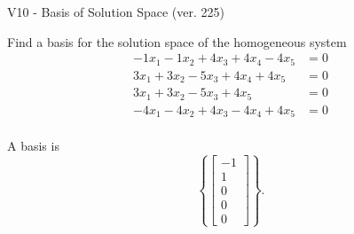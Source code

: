\begin{exercise}
  \begin{exerciseTitle}V10 - Basis of Solution Space (ver. 225)\end{exerciseTitle}
  \begin{exerciseStatement}
    Find a basis for the solution space of the homogeneous system 
\begin{align*}
 -1 x_ 1 -1 x_ 2 + 4 x_ 3 + 4 x_ 4 -4 x_ 5 &= 0  \\ 
  3 x_ 1 + 3 x_ 2 -5 x_ 3 + 4 x_ 4 + 4 x_ 5 &= 0  \\ 
  3 x_ 1 + 3 x_ 2 -5 x_ 3 + 4 x_ 5 &= 0  \\ 
  -4 x_ 1 -4 x_ 2 + 4 x_ 3 -4 x_ 4 + 4 x_ 5 &= 0  \\ 
 \end{align*}


 
  \end{exerciseStatement}

  \begin{exerciseAnswer}
   A basis is   
\[\left\{\left[\begin{array}{c}
-1 \\
1 \\
0 \\
0 \\
0
\end{array}\right]\right\}.\]

  


  \end{exerciseAnswer}
\end{exercise}